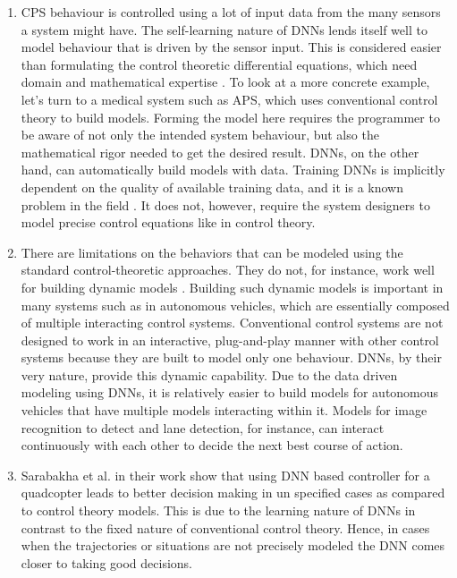  \begin{enumerate}
 	\item CPS behaviour is controlled using a lot of input data from the many sensors a system might have. The self-learning nature of DNNs lends itself well to model behaviour that is driven by the sensor input. This is considered easier than formulating the control theoretic differential equations, which need domain and mathematical expertise \cite{Aamir_2013}.
 	To look at a more concrete example, let's turn to a medical system such as \ac{APS}, which uses conventional control theory to build models. Forming the model here requires the programmer to be aware of not only the intended system behaviour, but also the mathematical rigor needed to get the desired result. DNNs, on the other hand, can automatically build models with data.
 	Training DNNs is implicitly dependent on the quality of available training data, and it is a known problem in the field \cite{jabbar2015methods}. It does not, however, require the system designers to model precise control equations like in control theory.
 	\item  There are limitations on the behaviors that can be modeled using the standard control-theoretic approaches. They do not, for instance, work well for building dynamic models \cite{article23}. Building such dynamic models is important in many systems such as in autonomous vehicles, which are essentially composed of multiple interacting control systems. Conventional control systems are not designed to work in an interactive, plug-and-play manner with other control systems because they are built to model only one behaviour. DNNs, by their very nature,  provide this dynamic capability. Due to the data driven modeling using DNNs, it is relatively easier to build models for autonomous vehicles that have multiple models interacting within it. Models for image recognition to detect and lane detection, for instance, can interact continuously with each other to decide the next best course of action.
 	\item Sarabakha et al. \cite{sarabakha2019online} in their work show that using \ac{DNN} based controller for a quadcopter leads to better decision making in un specified cases as compared to control theory models.
 	 This is due to the learning nature of \ac{DNN}s in contrast to the fixed nature of conventional control theory. 
 	 Hence, in cases when the trajectories or situations are not precisely modeled the \ac{DNN} comes closer to taking good decisions.
 \end{enumerate}



